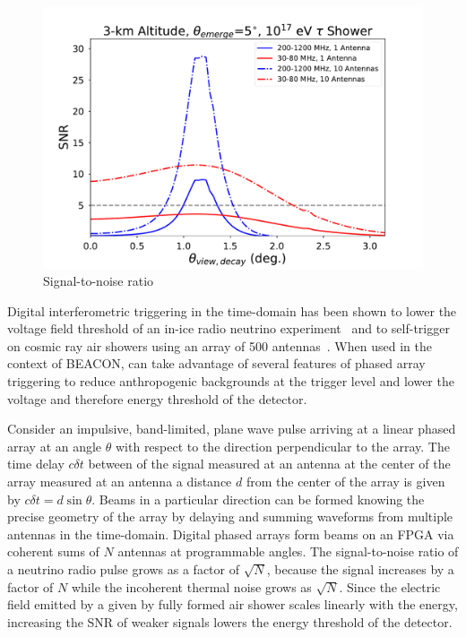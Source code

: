 \documentclass{PoS}
\begin{document}
\begin{figure}[htbp]
\begin{center}
\includegraphics[width=\textwidth]{figures/SNR_example_emerge5deg_10antenna}
\caption{Signal-to-noise ratio}
\label{fig:SNR}
\end{center}
\end{figure}

Digital interferometric triggering in the time-domain has been shown to lower the voltage field threshold of an in-ice radio neutrino experiment~\cite{oberla_ara_pa} and to self-trigger on cosmic ray air showers using an array of 500 antennas~\cite{ryan_monroe}. When used in the context of BEACON, can take advantage of several features of phased array triggering to reduce anthropogenic backgrounds at the trigger level and lower the voltage and therefore energy threshold of the detector.

Consider an impulsive, band-limited, plane wave pulse arriving at a linear phased array at an angle $\theta$ with respect to the direction perpendicular to the array. The time delay $c \delta t$ between of the signal measured at an antenna at the center of the array measured at an antenna a distance $d$ from the center of the array is given by $c \delta t = d \sin \theta$. Beams in a particular direction can be formed knowing the precise geometry of the array by delaying and summing waveforms from multiple antennas in the time-domain. Digital phased arrays form beams on an FPGA via coherent sums of $N$ antennas at programmable angles. The signal-to-noise ratio of a neutrino radio pulse grows as a factor of $\sqrt{N}$, because the signal increases by a factor of $N$ while the incoherent thermal noise grows as $\sqrt{N}$. Since the electric field emitted by a given by fully formed air shower scales linearly with the energy, increasing the SNR of weaker signals lowers the energy threshold of the detector. 
\end{document}
